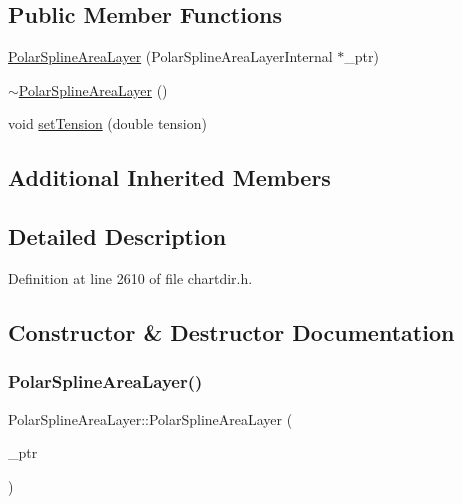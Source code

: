 \subsection*{Public Member Functions}
\begin{DoxyCompactItemize}
\item 
\hyperlink{class_polar_spline_area_layer_a0979c04deb3d5cd98d39e446ae8edfe1}{Polar\+Spline\+Area\+Layer} (Polar\+Spline\+Area\+Layer\+Internal $\ast$\+\_\+ptr)
\item 
\hyperlink{class_polar_spline_area_layer_a43d04447151e8530f32b281836898303}{$\sim$\+Polar\+Spline\+Area\+Layer} ()
\item 
void \hyperlink{class_polar_spline_area_layer_a8bddc5b2dacc33ca717e61651f5f67aa}{set\+Tension} (double tension)
\end{DoxyCompactItemize}
\subsection*{Additional Inherited Members}


\subsection{Detailed Description}


Definition at line 2610 of file chartdir.\+h.



\subsection{Constructor \& Destructor Documentation}
\mbox{\label{class_polar_spline_area_layer_a0979c04deb3d5cd98d39e446ae8edfe1}} 
\subsubsection{\texorpdfstring{Polar\+Spline\+Area\+Layer()}{PolarSplineAreaLayer()}}
{\footnotesize\ttfamily Polar\+Spline\+Area\+Layer\+::\+Polar\+Spline\+Area\+Layer (\begin{DoxyParamCaption}\item[{Polar\+Spline\+Area\+Layer\+Internal $\ast$}]{\+\_\+ptr }\end{DoxyParamCaption})\hspace{0.3cm}{\ttfamily [inline]}}



